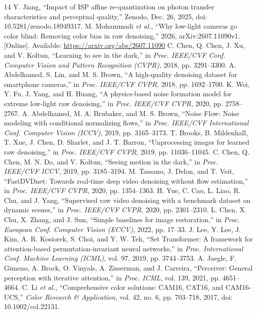 \begin{thebibliography}{14}
 Y. Jiang, ``Impact of ISP affine re-quantization on photon transfer characteristics and perceptual quality,'' Zenodo, Dec. 26, 2025, doi: 10.5281/zenodo.18949317.
 M. Mohammadi \emph{et al.}, ``Why low-light cameras go color blind: Removing color bias in raw denoising,'' 2026, arXiv:2607.11090v1. [Online]. Available: \url{https://arxiv.org/abs/2607.11090}
 C. Chen, Q. Chen, J. Xu, and V. Koltun, ``Learning to see in the dark,'' in \emph{Proc. IEEE/CVF Conf. Computer Vision and Pattern Recognition (CVPR)}, 2018, pp. 3291--3300.
 A. Abdelhamed, S. Lin, and M. S. Brown, ``A high-quality denoising dataset for smartphone cameras,'' in \emph{Proc. IEEE/CVF CVPR}, 2018, pp. 1692--1700.
 K. Wei, Y. Fu, J. Yang, and H. Huang, ``A physics-based noise formation model for extreme low-light raw denoising,'' in \emph{Proc. IEEE/CVF CVPR}, 2020, pp. 2758--2767.
 A. Abdelhamed, M. A. Brubaker, and M. S. Brown, ``Noise Flow: Noise modeling with conditional normalizing flows,'' in \emph{Proc. IEEE/CVF International Conf. Computer Vision (ICCV)}, 2019, pp. 3165--3173.
 T. Brooks, B. Mildenhall, T. Xue, J. Chen, D. Sharlet, and J. T. Barron, ``Unprocessing images for learned raw denoising,'' in \emph{Proc. IEEE/CVF CVPR}, 2019, pp. 11036--11045.
 C. Chen, Q. Chen, M. N. Do, and V. Koltun, ``Seeing motion in the dark,'' in \emph{Proc. IEEE/CVF ICCV}, 2019, pp. 3185--3194.
 M. Tassano, J. Delon, and T. Veit, ``FastDVDnet: Towards real-time deep video denoising without flow estimation,'' in \emph{Proc. IEEE/CVF CVPR}, 2020, pp. 1354--1363.
 H. Yue, C. Cao, L. Liao, R. Chu, and J. Yang, ``Supervised raw video denoising with a benchmark dataset on dynamic scenes,'' in \emph{Proc. IEEE/CVF CVPR}, 2020, pp. 2301--2310.
 L. Chen, X. Chu, X. Zhang, and J. Sun, ``Simple baselines for image restoration,'' in \emph{Proc. European Conf. Computer Vision (ECCV)}, 2022, pp. 17--33.
 J. Lee, Y. Lee, J. Kim, A. R. Kosiorek, S. Choi, and Y. W. Teh, ``Set Transformer: A framework for attention-based permutation-invariant neural networks,'' in \emph{Proc. International Conf. Machine Learning (ICML)}, vol. 97, 2019, pp. 3744--3753.
 A. Jaegle, F. Gimeno, A. Brock, O. Vinyals, A. Zisserman, and J. Carreira, ``Perceiver: General perception with iterative attention,'' in \emph{Proc. ICML}, vol. 139, 2021, pp. 4651--4664.
 C. Li \emph{et al.}, ``Comprehensive color solutions: CAM16, CAT16, and CAM16-UCS,'' \emph{Color Research \& Application}, vol. 42, no. 6, pp. 703--718, 2017, doi: 10.1002/col.22131.
\end{thebibliography}
